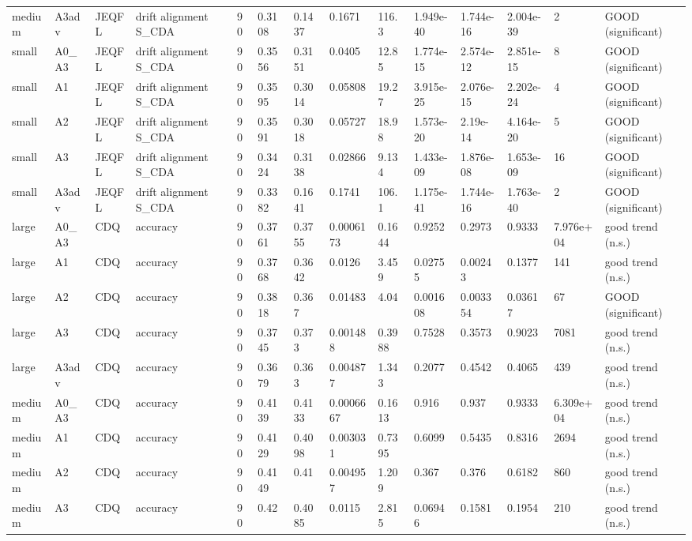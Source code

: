 \begin{table}[t]
\begin{tabular}{llllllllllllll}
medium & A3adv & JEQFL & drift alignment S\_CDA & 90 & 0.3108 & 0.1437 & 0.1671 & 116.3 & 1.949e-40 & 1.744e-16 & 2.004e-39 & 2 & GOOD (significant) \\
small & A0\_A3 & JEQFL & drift alignment S\_CDA & 90 & 0.3556 & 0.3151 & 0.0405 & 12.85 & 1.774e-15 & 2.574e-12 & 2.851e-15 & 8 & GOOD (significant) \\
small & A1 & JEQFL & drift alignment S\_CDA & 90 & 0.3595 & 0.3014 & 0.05808 & 19.27 & 3.915e-25 & 2.076e-15 & 2.202e-24 & 4 & GOOD (significant) \\
small & A2 & JEQFL & drift alignment S\_CDA & 90 & 0.3591 & 0.3018 & 0.05727 & 18.98 & 1.573e-20 & 2.19e-14 & 4.164e-20 & 5 & GOOD (significant) \\
small & A3 & JEQFL & drift alignment S\_CDA & 90 & 0.3424 & 0.3138 & 0.02866 & 9.134 & 1.433e-09 & 1.876e-08 & 1.653e-09 & 16 & GOOD (significant) \\
small & A3adv & JEQFL & drift alignment S\_CDA & 90 & 0.3382 & 0.1641 & 0.1741 & 106.1 & 1.175e-41 & 1.744e-16 & 1.763e-40 & 2 & GOOD (significant) \\
large & A0\_A3 & CDQ & accuracy & 90 & 0.3761 & 0.3755 & 0.0006173 & 0.1644 & 0.9252 & 0.2973 & 0.9333 & 7.976e+04 & good trend (n.s.) \\
large & A1 & CDQ & accuracy & 90 & 0.3768 & 0.3642 & 0.0126 & 3.459 & 0.02755 & 0.00243 & 0.1377 & 141 & good trend (n.s.) \\
large & A2 & CDQ & accuracy & 90 & 0.3818 & 0.367 & 0.01483 & 4.04 & 0.001608 & 0.003354 & 0.03617 & 67 & GOOD (significant) \\
large & A3 & CDQ & accuracy & 90 & 0.3745 & 0.373 & 0.001488 & 0.3988 & 0.7528 & 0.3573 & 0.9023 & 7081 & good trend (n.s.) \\
large & A3adv & CDQ & accuracy & 90 & 0.3679 & 0.363 & 0.004877 & 1.343 & 0.2077 & 0.4542 & 0.4065 & 439 & good trend (n.s.) \\
medium & A0\_A3 & CDQ & accuracy & 90 & 0.4139 & 0.4133 & 0.0006667 & 0.1613 & 0.916 & 0.937 & 0.9333 & 6.309e+04 & good trend (n.s.) \\
medium & A1 & CDQ & accuracy & 90 & 0.4129 & 0.4098 & 0.003031 & 0.7395 & 0.6099 & 0.5435 & 0.8316 & 2694 & good trend (n.s.) \\
medium & A2 & CDQ & accuracy & 90 & 0.4149 & 0.41 & 0.004957 & 1.209 & 0.367 & 0.376 & 0.6182 & 860 & good trend (n.s.) \\
medium & A3 & CDQ & accuracy & 90 & 0.42 & 0.4085 & 0.0115 & 2.815 & 0.06946 & 0.1581 & 0.1954 & 210 & good trend (n.s.) \\

\end{tabular}
\end{table}
